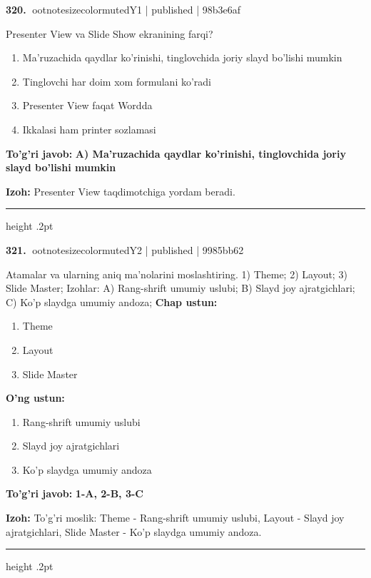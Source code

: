 \documentclass[10pt,a4paper]{article}
\begin{document}
\textbf{\color{ink}320.} {ootnotesizecolor{muted}Y1 | published | 98b3e6af}
\par
Presenter View va Slide Show ekranining farqi?
\begin{enumerate}[label=\Alph*),leftmargin=9mm]
\item Ma'ruzachida qaydlar ko'rinishi, tinglovchida joriy slayd bo'lishi mumkin
\item Tinglovchi har doim xom formulani ko'radi
\item Presenter View faqat Wordda
\item Ikkalasi ham printer sozlamasi
\end{enumerate}
\begin{tcolorbox}[enhanced,breakable,colback=teal!4,colframe=teal!55!black,boxrule=0.45pt,arc=1.2mm,left=2.8mm,right=2.8mm,top=2mm,bottom=2mm]
\textbf{\color{teal}To'g'ri javob:} \textbf{A) Ma'ruzachida qaydlar ko'rinishi, tinglovchida joriy slayd bo'lishi mumkin}
\par\smallskip
\textbf{Izoh:} Presenter View taqdimotchiga yordam beradi.
\end{tcolorbox}
\vspace{2mm}\hrule height .2pt\vspace{2mm}

\textbf{\color{ink}321.} {ootnotesizecolor{muted}Y2 | published | 9985bb62}
\par
Atamalar va ularning aniq ma'nolarini moslashtiring.  1) Theme;  2) Layout;  3) Slide Master;  Izohlar: A) Rang-shrift umumiy uslubi;  B) Slayd joy ajratgichlari;  C) Ko'p slaydga umumiy andoza;
\textbf{Chap ustun:}\begin{enumerate}[label=\arabic*),leftmargin=9mm]
\item Theme
\item Layout
\item Slide Master
\end{enumerate}
\textbf{O'ng ustun:}\begin{enumerate}[label=\Alph*),leftmargin=9mm]
\item Rang-shrift umumiy uslubi
\item Slayd joy ajratgichlari
\item Ko'p slaydga umumiy andoza
\end{enumerate}
\begin{tcolorbox}[enhanced,breakable,colback=teal!4,colframe=teal!55!black,boxrule=0.45pt,arc=1.2mm,left=2.8mm,right=2.8mm,top=2mm,bottom=2mm]
\textbf{\color{teal}To'g'ri javob:} \textbf{1-A, 2-B, 3-C}
\par\smallskip
\textbf{Izoh:} To'g'ri moslik: Theme - Rang-shrift umumiy uslubi, Layout - Slayd joy ajratgichlari, Slide Master - Ko'p slaydga umumiy andoza.
\end{tcolorbox}
\vspace{2mm}\hrule height .2pt\vspace{2mm}
\end{document}
